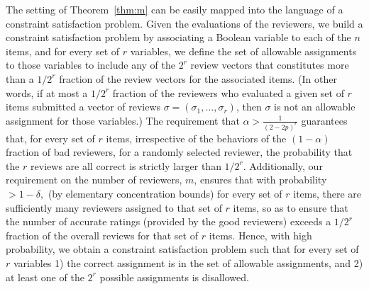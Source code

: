 \documentclass[final,12pt]{colt2018}
\newcommand{\eps}{\epsilon}
\begin{document}
\medskip

\iffalse
\begin{theorem}\label{thm:mainCSP}
Fix a failure probability $\delta>0$ and accuracy parameter $\eps > 0$.  Consider a set of $n$ Boolean variables, $v_1,\ldots,v_n$ together with a set of nontrivial constraints on the values of every $r$-tuple.  That is, for all sets of $r$ variables, $t=\{v_{i1},\ldots,v_{ir}\},$ there is an associated set $C_t \subset \{0,1\}^r$ of possible assignments to the variables, with $|C_t| \le 2^{r} - 1.$  Provided there exists an assignment $\sigma$ that satisfies all the constraints, then there exists an algorithm that takes as input the set of constraints $\{C_t\}$ and the assignments that $\sigma$ assigns to a set of $k = O(2^r\log(1/\eps)$ randomly selected variables, and outputs an assignment $\sigma'$ that, with probability at least $1-\delta$, differs from $\sigma$ in at most $\eps n$ variables.
\end{theorem}
\fi

The setting of Theorem~\ref{thm:m} can be easily mapped into the language of a constraint satisfaction problem.  Given the evaluations of the reviewers, we build a constraint satisfaction problem by associating a Boolean variable to each of the $n$ items, and for every set of $r$ variables, we define the set of allowable assignments to those variables to include any of the $2^r$ review vectors that constitutes more than a $1/2^r$ fraction of the review vectors for the associated items.   (In other words, if at most a $1/2^r$ fraction of the reviewers who evaluated a given set of $r$ items submitted a vector of reviews $\sigma=(\sigma_1,\ldots,\sigma_r)$, then $\sigma$ is not an allowable assignment for those variables.)   The requirement that $\alpha > \frac{1}{(2-2p)^r}$ guarantees that, for every set of $r$ items, irrespective of the behaviors of the $(1-\alpha)$ fraction of bad reviewers, for a randomly selected reviewer, the probability that the $r$  reviews are all correct is strictly larger than $1/2^r$. Additionally, our requirement on the number of reviewers, $m$, ensures that with probability $> 1-\delta,$ (by elementary concentration bounds) for every set of $r$ items, there are sufficiently many reviewers assigned to that set of $r$ items, so as to ensure that the number of accurate ratings (provided by the good reviewers) exceeds a $1/2^r$ fraction of the overall reviews for that set of $r$ items.  Hence, with high probability, we obtain a constraint satisfaction problem such that for every set of $r$ variables 1) the correct assignment is in the set of allowable assignments, and 2) at least one of the $2^r$ possible assignments is disallowed.
\end{document}
